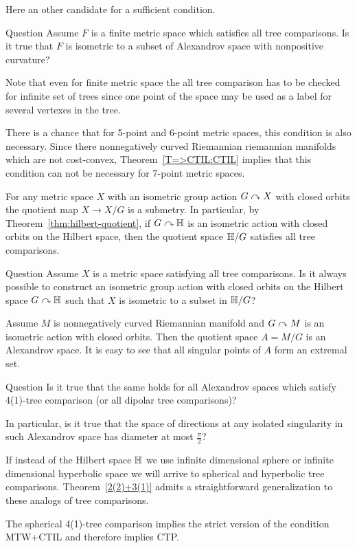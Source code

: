Here an other candidate for a sufficient condition.

\begin{thm}{Question}
Assume $F$ is a finite metric space which satisfies all tree comparisons.
Is it true that $F$ is isometric to a subset of Alexandrov space with nonpositive curvature?
\end{thm}

Note that even for finite metric space the all tree comparison has to be checked for infinite set of trees since one point of the space may be used as a label for several vertexes in the tree.

There is a chance that for 5-point and 6-point metric spaces, this condition is also necessary. 
Since there nonnegatively curved Riemannian riemannian manifolds which are not cost-convex, 
Theorem~\ref{T=>CTIL:CTIL} implies that this condition can not be necessary for 7-point metric spaces.

For any metric space $X$ with an isometric group action $G\curvearrowright X$ with closed orbits the quotient map $X\to X/G$ is a submetry.
In particular, by Theorem~\ref{thm:hilbert-quotient}, if $G\curvearrowright \mathbb{H}$ is an isometric action with closed orbits on the Hilbert space, then the quotient space $\mathbb{H}/G$ satisfies all tree comparisons.

\begin{thm}{Question}
Assume $X$ is a metric space satisfying all tree comparisons.
Is it always possible to construct an isometric group action with closed orbits on the Hilbert space $G\curvearrowright \mathbb{H}$ such that $X$ is isometric to a subset in $\mathbb{H}/G$?
\end{thm}

Assume $M$ is nonnegatively curved Riemannian manifold
and $G\curvearrowright M$ is an isometric action with closed orbits.
Then the quotient space $A=M/G$ is an Alexandrov space.
It is easy to see that all singular points of $A$ form an extremal set.

\begin{thm}{Question}
Is it true that the same holds for all Alexandrov spaces which satisfy 4(1)-tree  comparison (or all dipolar tree comparisons)?

In particular, is it true that the space of directions at any isolated singularity in such Alexandrov space has diameter at most $\tfrac\pi2$?
\end{thm}

If instead of the Hilbert space $\mathbb{H}$ we use infinite dimensional sphere or infinite dimensional hyperbolic space we will arrive to spherical and hyperbolic tree comparisons.
Theorem~\ref{2(2)+3(1)} admits a straightforward generalization to these analogs of tree comparisons.

The spherical 4(1)-tree comparison implies the strict version of the condition MTW+CTIL and therefore implies CTP.


